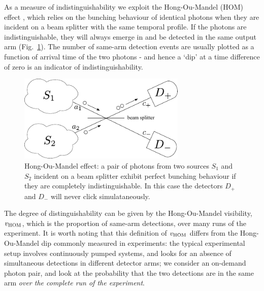As a measure of indistinguishability we exploit the Hong-Ou-Mandel (HOM) effect \cite{HOM}, which relies on the bunching behaviour of identical photons when they are incident on a beam splitter with the same temporal profile. If the photons are indistinguishable, they will always emerge in and be detected in the same output arm (Fig.~\ref{HOM_expt}). The number of same-arm detection events are usually plotted as a function of arrival time of the two photons - and hence a `dip' at a time difference of zero is an indicator of indistinguishability.
\begin{figure}[htb]
  \begin{center}
  \includegraphics[width=8cm]{assets/HOM_expt.pdf}
  \end{center}
  \caption{Hong-Ou-Mandel effect: a pair of photons from two sources $S_1$ and $S_2$ incident on a beam splitter exhibit perfect bunching behaviour if they are completely indistinguishable. In this case the detectors  $D_+$ and $D_-$ will never click simulataneously.}
  \label{HOM_expt}
\end{figure}
The degree of distinguishability can be given by the Hong-Ou-Mandel visibility, $v_{\rm HOM}$, which is the proportion of same-arm detections, over many runs of the experiment. It is worth noting that this definition of $v_{\rm HOM}$ differs from the Hong-Ou-Mandel dip commonly measured in experiments: the typical experimental setup involves continuously pumped systems, and looks for an absence of simultaneous detections in different detector arms; we consider an on-demand photon pair, and look at the probability that the two detections are in the same arm \textit{over the complete run of the experiment}. 

